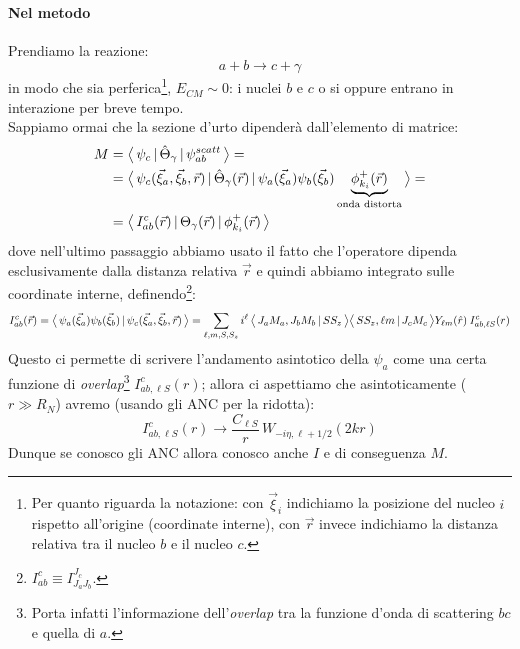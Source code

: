 \paragraph{Nel metodo}
Prendiamo la reazione:
$$a + b \to c+\gamma$$
in modo che sia perferica\footnote{Per quanto riguarda la notazione: con $\vec{\xi}_i$ indichiamo la posizione del nucleo $i$ rispetto all'origine (coordinate interne), con $\vec{r}$ invece indichiamo la distanza relativa tra il nucleo $b$ e il nucleo $c$.}, $E_{CM}\sim 0$: i nuclei $b$ e $c$ o si  oppure entrano in interazione per breve tempo.\\ 
Sappiamo ormai che la sezione d'urto dipenderà dall'elemento di matrice:
\begin{align*}
	M 
	&= \bigl\langle\, \psi_c\, |\,\hat{\Theta}_\gamma\, |\,\psi_{ab}^{scatt}\, \bigr\rangle =\\
	&= \bigl\langle\, \psi_c (\vec{\xi}_a,\vec{\xi}_b,\vec{r})\, |\,\hat{\Theta}_\gamma (	\vec{r})\, |\,\psi_{a}(\vec{\xi}_a)\psi_b(\vec{\xi}_b)\underbrace{\phi^+_{k_i}(\vec{r})}_\text{onda distorta}\, \bigr\rangle =\\ 
	&= \bigl\langle\, I_{ab}^c(\vec{r})\, |\,\Theta_\gamma(\vec{r})\, |\,\phi^+_{k_i}(\vec{r})\, \bigr\rangle
\end{align*}
dove nell'ultimo passaggio abbiamo usato il fatto che l'operatore dipenda esclusivamente dalla distanza relativa $\vec{r}$ e quindi abbiamo integrato sulle coordinate interne, definendo\footnote{$I_{ab}^c \equiv I_{J_a J_b}^{J_c}$.}:
$$
I_{ab}^c (\vec{r}) = \bigl\langle\, \psi_a(\vec{\xi}_a)\psi_b(\vec{\xi}_b)\, |\, \psi_c(\vec{\xi}_a,\vec{\xi}_b,\vec{r})\, \bigr\rangle = \sum_{\ell,m,S,S_z} i^\ell \, \bigl\langle\, J_a M_a,J_b M_b\, |\, SS_z\, \bigr\rangle \bigl\langle\, SS_z, \ell m\, |\, J_c M_c\, \bigr\rangle Y_{\ell m}(\hat{r})\:I_{ab,\ell S}^c (r)
$$
Questo ci permette di scrivere l'andamento asintotico della $\psi_a$ come una certa funzione di \textit{overlap}\footnote{Porta infatti l'informazione dell'\textit{overlap} tra la funzione d'onda di scattering $bc$ e quella di $a$.} $I_{ab,\ell S}^c (r)$; allora ci aspettiamo che asintoticamente ($r\gg R_N$) avremo (usando gli ANC per la ridotta):
$$I_{ab,\ell S}^c (r) \to \frac{C_{\ell S}}{r} \, W_{-i\eta,\ell+1/2} (2kr)$$%
Dunque se conosco gli ANC allora conosco anche $I$ e di conseguenza $M$.

